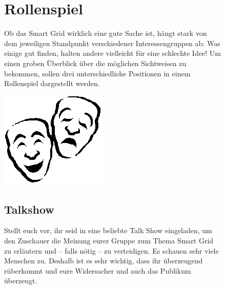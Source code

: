 \documentclass[11pt,a4paper,DIV=8,]{scrartcl}
\begin{document}
\reversemarginpar

\begin{figure}[H]
\begin{minipage}[c]{0.84\linewidth}
\section*{Rollenspiel}
Ob das Smart Grid wirklich eine gute Sache ist, hängt stark von dem jeweiligen Standpunkt
verschiedener Interessengruppen ab: Was einige gut finden, halten andere vielleicht für eine
schlechte Idee! Um einen groben Überblick über die möglichen Sichtweisen zu bekommen,
sollen drei unterschiedliche Positionen in einem Rollenspiel dargestellt werden.
\end{minipage}
\hfill
\begin{minipage}[c]{0.15\linewidth}
\vspace{0pt}
\flushright
\includegraphics[scale=0.25]{images/rollenspiel}
\end{minipage}
\end{figure}
\begin{figure}[H]
\begin{minipage}[]{0.15\linewidth}
\subsection*{Talkshow}
\end{minipage}
\hfill
\begin{minipage}[t]{0.85\linewidth}
Stellt euch vor, ihr seid in eine beliebte Talk Show eingeladen, um den Zuschauer
die Meinung eurer Gruppe zum Thema Smart Grid zu erläutern und -- falls nötig -- zu verteidigen. Es schauen sehr viele Menschen zu. Deshalb ist es sehr wichtig, dass ihr überzeugend rüberkommt und eure Widersacher und auch das Publikum überzeugt.
\end{minipage}
\end{figure}
\end{document}
